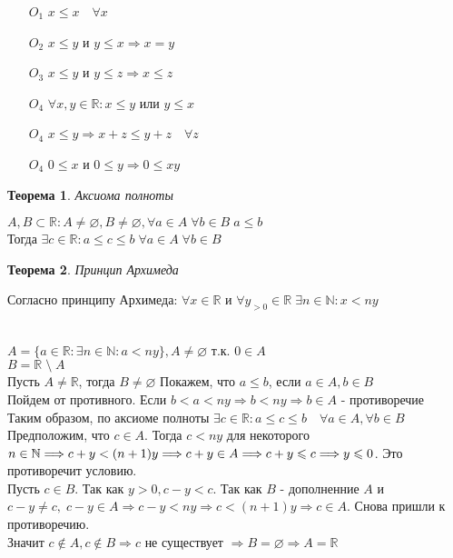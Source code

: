 \documentclass[12pt,letterpaper]{report}
\makeatletter
\newtheorem*{theorem-non}{Теорема}
\theoremstyle{definition}
\renewenvironment{proof}[1][\proofname]{%
   \par\pushQED{\qed}\normalfont%
   \topsep6\p@\@plus6\p@\relax
   \trivlist\item[\hskip\labelsep\bfseries#1\@addpunct{.}]%
   \ignorespaces
}{%
   \popQED\endtrivlist\@endpefalse
}
\makeatother
\begin{document}
\begin{itemize}
    \item[$O_1$] $x \leqslant x \quad \forall x$
    \item[$O_2$] $x \leqslant y $  и  $ y \leqslant x \Longrightarrow x = y$ 
    \item[$O_3$] $x \leqslant y $  и  $ y \leqslant z \Longrightarrow x \leqslant z$ 
    \item[$O_4$] $\forall x, y \in \mathbb{R} : x \leqslant y $ или $ y \leqslant x$
    \item[$O_4$] $x \leqslant y \Longrightarrow x + z \leqslant y + z \quad \forall z$ 
    \item[$O_4$] $0 \leqslant x $ и $ 0 \leqslant y \Longrightarrow 0 \leqslant xy$  
\end{itemize}
\begin{theorem-non}
    Аксиома полноты
\end{theorem-non}
$A, B \subset \mathbb{R} : A \neq \varnothing, B \neq \varnothing, \forall a \in A \; \forall b \in B \; a \leqslant b$ \\
Тогда $\exists c \in \mathbb{R} : a \leqslant c \leqslant b \; \forall a \in A \; \forall b \in B$
\begin{theorem-non}
    Принцип Архимеда
\end{theorem-non}
Согласно принципу Архимеда: $\forall x \in \mathbb{R}$ и $\forall y_{>0} \in \mathbb{R} \; \exists n \in \mathbb{N} : x < ny$
\begin{proof}  
    \quad \\ $A = \{a \in \mathbb{R} : \exists n \in \mathbb{N} : a < ny\}, A \neq \varnothing$ т.к. $0 \in A$ \\
    $B = \mathbb{R} \; \setminus \; A$ \\
    Пусть $A \neq \mathbb{R}$, тогда $B \neq \varnothing$ Покажем, что $a \leqslant b$, если $a \in A, b \in B$ \\
    Пойдем от противного. Если $b < a < ny \Longrightarrow b < ny \Longrightarrow b \in A$ - противоречие \\
    Таким образом, по аксиоме полноты $\exists c \in \mathbb{R} : a \leqslant c \leqslant b \quad \forall a \in A, \forall b \in B$ \\
    Предположим, что $c \in A$. Тогда $c < ny$ для некоторого $n \in \mathbb{N} \Longrightarrow c + y < (n + 1)y \Longrightarrow \\ 
    c + y \in A \Longrightarrow c + y \leqslant c \Longrightarrow y \leqslant 0$. Это противоречит условию. \\
    Пусть $c \in B$. Так как $y > 0, c - y < c$. Так как $B$ - дополненние $A$ и $c - y \neq c, \; c - y \in A
    \Longrightarrow c - y < ny \Longrightarrow c < (n + 1)y \Longrightarrow c \in A$. Снова пришли к противоречию. \\
    Значит $c \notin A, c \notin B \Longrightarrow c$ не существует $\Longrightarrow B = \varnothing \Longrightarrow A = \mathbb{R}$ 
\end{proof}
\end{document}

